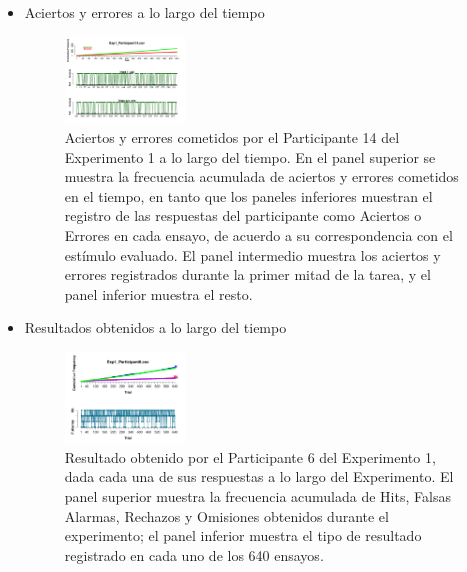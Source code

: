 \begin{itemize}
\item Aciertos y errores a lo largo del tiempo


\begin{figure}[th]
\centering
\includegraphics[width=0.30\textwidth]{Figures/Success_Exp1_P14}
\caption[Aciertos y errores a lo largo del tiempo: Ejemplo]{Aciertos y errores cometidos por el Participante 14 del Experimento 1 a lo largo del tiempo. En el panel superior se muestra la frecuencia acumulada de aciertos y errores cometidos en el tiempo, en tanto que los paneles inferiores muestran el registro de las respuestas del participante como Aciertos o Errores en cada ensayo, de acuerdo a su correspondencia con el estímulo evaluado. El panel intermedio muestra los aciertos y errores registrados durante la primer mitad de la tarea, y el panel inferior muestra el resto.}
\label{fig:Rating_E1_P14}
\end{figure}


\item Resultados obtenidos a lo largo del tiempo

\begin{figure}[th]
\centering
\includegraphics[width=0.30\textwidth]{Figures/Outcome_Exp1_P6}
\caption[Resultado obtenido a lo largo del tiempo: Ejemplo]{Resultado obtenido por el Participante 6 del Experimento 1, dada cada una de sus respuestas a lo largo del Experimento. El panel superior muestra la frecuencia acumulada de Hits, Falsas Alarmas, Rechazos y Omisiones obtenidos durante el experimento; el panel inferior muestra el tipo de resultado registrado en cada uno de los 640 ensayos.}
\label{fig:Outcome_E1_P14}
\end{figure}

\end{itemize}

